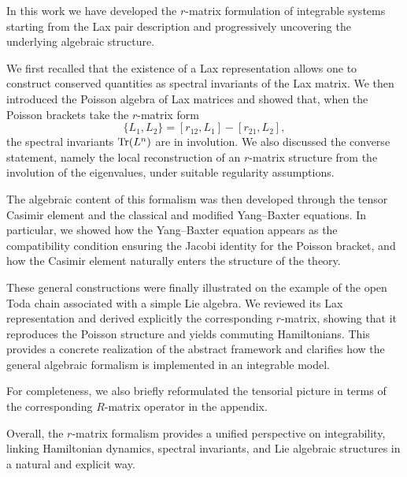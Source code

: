 In this work we have developed the $r$-matrix formulation of integrable systems starting from the Lax pair description and progressively uncovering the underlying algebraic structure.

We first recalled that the existence of a Lax representation allows one to construct conserved quantities as spectral invariants of the Lax matrix. We then introduced the Poisson algebra of Lax matrices and showed that, when the Poisson brackets take the $r$-matrix form
\begin{equation}
    \{L_1,L_2\} = [r_{12},L_1] - [r_{21},L_2],
\end{equation}
the spectral invariants $\Tr(L^n)$ are in involution. We also discussed the converse statement, namely the local reconstruction of an $r$-matrix structure from the involution of the eigenvalues, under suitable regularity assumptions.

The algebraic content of this formalism was then developed through the tensor Casimir element and the classical and modified Yang--Baxter equations. In particular, we showed how the Yang--Baxter equation appears as the compatibility condition ensuring the Jacobi identity for the Poisson bracket, and how the Casimir element naturally enters the structure of the theory.

These general constructions were finally illustrated on the example of the open Toda chain associated with a simple Lie algebra. We reviewed its Lax representation and derived explicitly the corresponding $r$-matrix, showing that it reproduces the Poisson structure and yields commuting Hamiltonians. This provides a concrete realization of the abstract framework and clarifies how the general algebraic formalism is implemented in an integrable model.

For completeness, we also briefly reformulated the tensorial picture in terms of the corresponding $R$-matrix operator in the appendix.

Overall, the $r$-matrix formalism provides a unified perspective on integrability, linking Hamiltonian dynamics, spectral invariants, and Lie algebraic structures in a natural and explicit way.